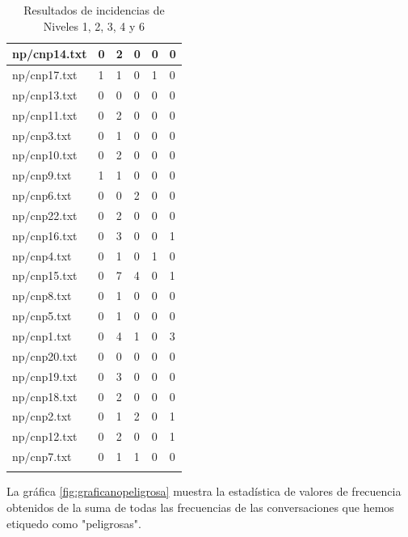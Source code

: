 \begin{center}
\begin{longtable}{|l|l|l|l|l|l|}
\hline
np/cnp14.txt & 0 & 2 & 0 & 0 & 0 \\
\hline
np/cnp17.txt & 1 & 1 & 0 & 1 & 0 \\
\hline
np/cnp13.txt & 0 & 0 & 0 & 0 & 0 \\
\hline
np/cnp11.txt & 0 & 2 & 0 & 0 & 0 \\
\hline
np/cnp3.txt & 0 & 1 & 0 & 0 & 0 \\
\hline
np/cnp10.txt & 0 & 2 & 0 & 0 & 0 \\
\hline
np/cnp9.txt & 1 & 1 & 0 & 0 & 0 \\
\hline
np/cnp6.txt & 0 & 0 & 2 & 0 & 0 \\
\hline
np/cnp22.txt & 0 & 2 & 0 & 0 & 0 \\
\hline
np/cnp16.txt & 0 & 3 & 0 & 0 & 1 \\
\hline
np/cnp4.txt & 0 & 1 & 0 & 1 & 0 \\
\hline
np/cnp15.txt & 0 & 7 & 4 & 0 & 1 \\
\hline
np/cnp8.txt & 0 & 1 & 0 & 0 & 0 \\
\hline
np/cnp5.txt & 0 & 1 & 0 & 0 & 0 \\
\hline
np/cnp1.txt & 0 & 4 & 1 & 0 & 3 \\
\hline
np/cnp20.txt & 0 & 0 & 0 & 0 & 0 \\
\hline
np/cnp19.txt & 0 & 3 & 0 & 0 & 0 \\
\hline
np/cnp18.txt & 0 & 2 & 0 & 0 & 0 \\
\hline
np/cnp2.txt & 0 & 1 & 2 & 0 & 1 \\
\hline
np/cnp12.txt & 0 & 2 & 0 & 0 & 1 \\
\hline
\pagebreak
np/cnp7.txt & 0 & 1 & 1 & 0 & 0 \\ 
\hline

\caption{Resultados de incidencias de Niveles 1, 2, 3, 4 y 6 }
\label{table:resultadosNiveles}
\end{longtable}
\end{center}




La gr\'afica \ref{fig:graficanopeligrosa} muestra la estad\'istica de valores de frecuencia obtenidos de la suma de todas las frecuencias de las conversaciones que hemos etiquedo como "peligrosas".

